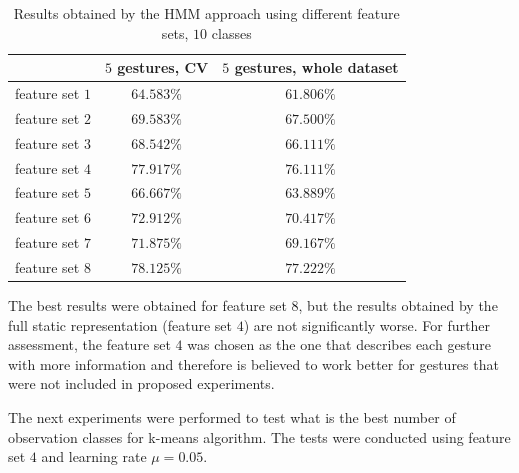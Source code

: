\begin{table}[htp!]
	\label{tab:dyn1}
	\caption{Results obtained by the HMM approach using different feature sets, $10$ classes}
    \begin{tabular}{|c|c|c|}
    \hline
    ~                                 & $5$ gestures, CV & $5$ gestures, whole dataset  \\ \hline
    feature set $1$                     & $64.583\%$ & $61.806\%$   \\ \hline
    feature set $2$                     & $69.583\%$ & $67.500\%$   \\ \hline
    feature set $3$                     & $68.542\%$ & $66.111\%$   \\ \hline
    feature set $4$          		  & $77.917\%$ & $76.111\%$   \\ \hline
    feature set $5$                     & $66.667\%$ & $63.889\%$   \\ \hline
    feature set $6$                    & $72.912\%$ & $70.417\%$   \\ \hline
    feature set $7$                    & $71.875\%$ & $69.167\%$   \\ \hline
    feature set $8$                    & $78.125\%$ & $77.222\%$   \\ \hline
    \end{tabular}
\end{table}
  
The best results were obtained for feature set $8$, but the results obtained by the full static representation (feature set $4$) are not significantly worse.
For further assessment, the feature set $4$ was chosen as the one that describes each gesture with more information and therefore is believed to work better for gestures that were not included in proposed experiments.

The next experiments were performed to test what is the best number of observation classes for k-means algorithm. 
The tests were conducted using feature set $4$ and learning rate $\mu=0.05$.

